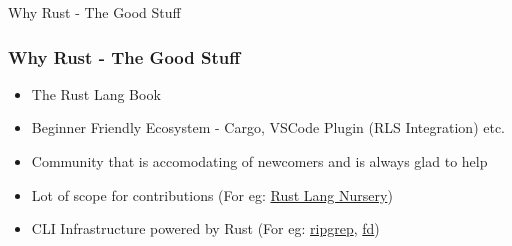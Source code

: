 \begin{section}{Why Rust - The Good Stuff}
  \begin{frame}
    \frametitle{Why Rust - The Good Stuff}
    \begin{itemize}
    \item The Rust Lang Book \cite{RustLang}
    \item Beginner Friendly Ecosystem - Cargo, VSCode Plugin (RLS Integration) etc.
    \item Community that is accomodating of newcomers and is always glad to help
    \item Lot of scope for contributions (For eg: \href{https://github.com/rust-lang-nursery/}{Rust Lang Nursery})
    \item CLI Infrastructure powered by Rust (For eg: \href{https://github.com/BurntSushi/riggrep/}{ripgrep}, \href{https://github.com/sharkdp/fd/}{fd})
    \end{itemize}
  \end{frame}
\end{section}
